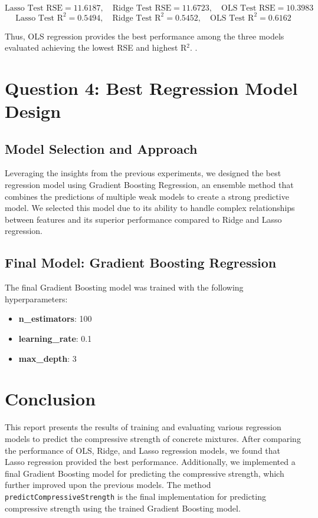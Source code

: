 \documentclass[a4paper,12pt]{article}
\begin{document}
\[
\text{Lasso Test RSE} = 11.6187, \quad \text{Ridge Test RSE} = 11.6723, \quad \text{OLS Test RSE} = 10.3983
\]
\[
\text{Lasso Test R}^2 = 0.5494, \quad \text{Ridge Test R}^2 = 0.5452, \quad \text{OLS Test R}^2 = 0.6162
\]

Thus, OLS regression provides the best performance among the three models evaluated achieving the lowest RSE and highest R\(^2\). .

\section*{Question 4: Best Regression Model Design}

\subsection*{Model Selection and Approach}
Leveraging the insights from the previous experiments, we designed the best regression model using Gradient Boosting Regression, an ensemble method that combines the predictions of multiple weak models to create a strong predictive model. We selected this model due to its ability to handle complex relationships between features and its superior performance compared to Ridge and Lasso regression.

\subsection*{Final Model: Gradient Boosting Regression}
The final Gradient Boosting model was trained with the following hyperparameters:
\begin{itemize}
    \item \textbf{n\_estimators}: 100
    \item \textbf{learning\_rate}: 0.1
    \item \textbf{max\_depth}: 3
\end{itemize}



\section*{Conclusion}
This report presents the results of training and evaluating various regression models to predict the compressive strength of concrete mixtures. After comparing the performance of OLS, Ridge, and Lasso regression models, we found that Lasso regression provided the best performance. Additionally, we implemented a final Gradient Boosting model for predicting the compressive strength, which further improved upon the previous models. The method \texttt{predictCompressiveStrength} is the final implementation for predicting compressive strength using the trained Gradient Boosting model.
\end{document}
